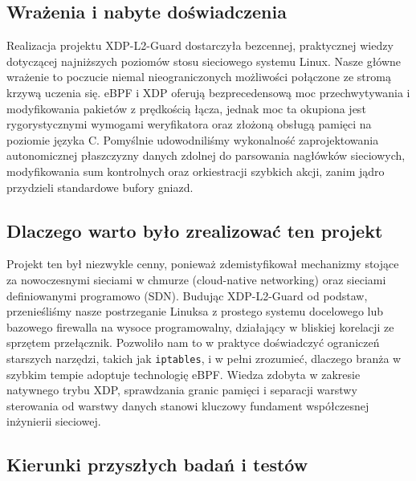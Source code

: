 \documentclass[11pt,a4paper]{article}
\begin{document}
\subsection{Wrażenia i nabyte doświadczenia}

Realizacja projektu XDP-L2-Guard dostarczyła bezcennej, praktycznej wiedzy dotyczącej najniższych poziomów stosu sieciowego systemu Linux. Nasze główne wrażenie to poczucie niemal nieograniczonych możliwości połączone ze stromą krzywą uczenia się. eBPF i XDP oferują bezprecedensową moc przechwytywania i modyfikowania pakietów z prędkością łącza, jednak moc ta okupiona jest rygorystycznymi wymogami weryfikatora oraz złożoną obsługą pamięci na poziomie języka C. Pomyślnie udowodniliśmy wykonalność zaprojektowania autonomicznej płaszczyzny danych zdolnej do parsowania nagłówków sieciowych, modyfikowania sum kontrolnych oraz orkiestracji szybkich akcji, zanim jądro przydzieli standardowe bufory gniazd.

\subsection{Dlaczego warto było zrealizować ten projekt}

Projekt ten był niezwykle cenny, ponieważ zdemistyfikował mechanizmy stojące za nowoczesnymi sieciami w chmurze (cloud-native networking) oraz sieciami definiowanymi programowo (SDN). Budując XDP-L2-Guard od podstaw, przenieśliśmy nasze postrzeganie Linuksa z prostego systemu docelowego lub bazowego firewalla na wysoce programowalny, działający w bliskiej korelacji ze sprzętem przełącznik. Pozwoliło nam to w praktyce doświadczyć ograniczeń starszych narzędzi, takich jak \texttt{iptables}, i w pełni zrozumieć, dlaczego branża w szybkim tempie adoptuje technologię eBPF. Wiedza zdobyta w zakresie natywnego trybu XDP, sprawdzania granic pamięci i separacji warstwy sterowania od warstwy danych stanowi kluczowy fundament współczesnej inżynierii sieciowej.

\subsection{Kierunki przyszłych badań i testów}
\end{document}
